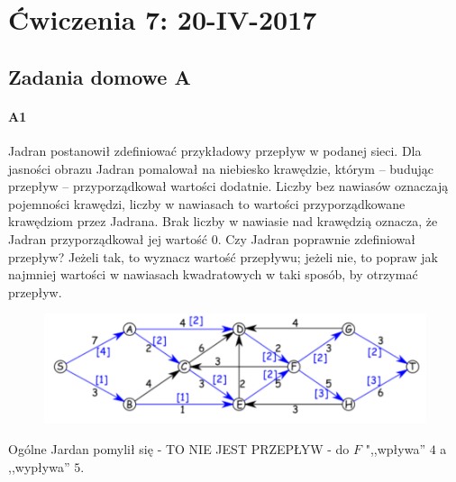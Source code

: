 \section{Ćwiczenia 7: 20-IV-2017}
\subsection{Zadania domowe A}

\paragraph{A1} Jadran postanowił zdefiniować przykładowy przepływ w podanej sieci. Dla jasności obrazu Jadran pomalował na niebiesko krawędzie, którym – budując przepływ – przyporządkował wartości dodatnie. Liczby bez nawiasów oznaczają pojemności krawędzi, liczby w nawiasach to wartości przyporządkowane krawędziom przez Jadrana. Brak liczby w nawiasie nad krawędzią oznacza, że Jadran przyporządkował jej wartość 0. Czy Jadran poprawnie zdefiniował przepływ? Jeżeli tak, to wyznacz wartość przepływu; jeżeli nie, to popraw jak najmniej wartości w nawiasach kwadratowych w taki sposób, by otrzymać przepływ.
\begin{figure}[H]
\centering
\includegraphics[width=.8\textwidth]{img/7_A1}
\end{figure}
Ogólne Jardan pomylił się - TO NIE JEST PRZEPŁYW - do $F$ ",,wpływa'' $4$ a ,,wypływa'' $5$.

